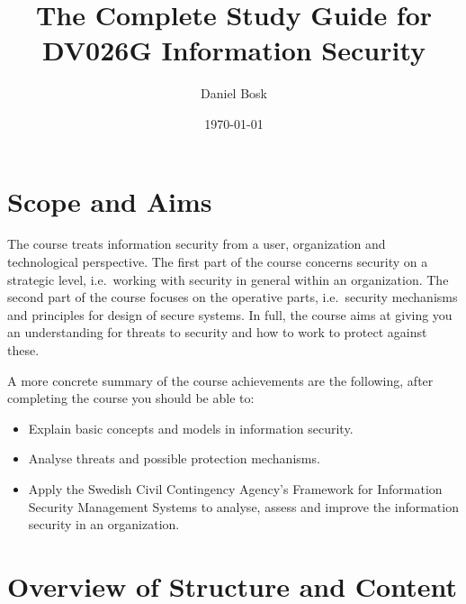 \title{%
  The Complete Study Guide for\\
  DV026G Information Security
}
\author{%
  Daniel Bosk
}
\date{\today}

\maketitle


\section{Scope and Aims}
\label{sec:aim}
The course treats information security from a user, organization and 
technological perspective.
The first part of the course concerns security on a strategic level, 
i.e.~working with security in general within an organization.
The second part of the course focuses on the operative parts, i.e.~security 
mechanisms and principles for design of secure systems.
In full, the course aims at giving you an understanding for threats to security 
and how to work to protect against these.

A more concrete summary of the course achievements are the following, after 
completing the course you should be able to:
\begin{itemize}
%  
%  
%  
%  
%  
%  
%  
  \item Explain basic concepts and models in information security.
  \item Analyse threats and possible protection mechanisms.
  \item Apply the Swedish Civil Contingency Agency's Framework for Information 
    Security Management Systems to analyse, assess and improve the information 
    security in an organization.
\end{itemize}


\section{Overview of Structure and Content}
\label{sec:outline}
%
%


